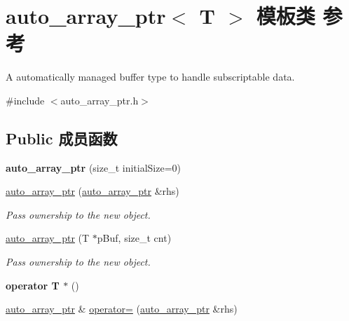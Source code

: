 \hypertarget{classauto__array__ptr}{\section{auto\+\_\+array\+\_\+ptr$<$ T $>$ 模板类 参考}
\label{classauto__array__ptr}
}


A automatically managed buffer type to handle subscriptable data.  




{\ttfamily \#include $<$auto\+\_\+array\+\_\+ptr.\+h$>$}

\subsection*{Public 成员函数}
\begin{DoxyCompactItemize}
\item 
\hypertarget{classauto__array__ptr_a7ea518e74e02d19362965a74fce2b5f2}{{\bfseries auto\+\_\+array\+\_\+ptr} (size\+\_\+t initial\+Size=0)}\label{classauto__array__ptr_a7ea518e74e02d19362965a74fce2b5f2}

\item 
\hypertarget{classauto__array__ptr_a30d6debbcb1db493ef46919e6d6b37a1}{\hyperlink{classauto__array__ptr_a30d6debbcb1db493ef46919e6d6b37a1}{auto\+\_\+array\+\_\+ptr} (\hyperlink{classauto__array__ptr}{auto\+\_\+array\+\_\+ptr} \&rhs)}\label{classauto__array__ptr_a30d6debbcb1db493ef46919e6d6b37a1}

\begin{DoxyCompactList}\small\item\em Pass ownership to the new object. \end{DoxyCompactList}\item 
\hyperlink{classauto__array__ptr_ab75a4d7273eabb7180e07316043ad836}{auto\+\_\+array\+\_\+ptr} (T $\ast$p\+Buf, size\+\_\+t cnt)
\begin{DoxyCompactList}\small\item\em Pass ownership to the new object. \end{DoxyCompactList}\item 
\hypertarget{classauto__array__ptr_a1b183d6062ad338e05ad374738e4d65c}{{\bfseries operator T $\ast$} ()}\label{classauto__array__ptr_a1b183d6062ad338e05ad374738e4d65c}

\item 
\hypertarget{classauto__array__ptr_a764352bc820c5b67b36becfb6ead7233}{\hyperlink{classauto__array__ptr}{auto\+\_\+array\+\_\+ptr} \& \hyperlink{classauto__array__ptr_a764352bc820c5b67b36becfb6ead7233}{operator=} (\hyperlink{classauto__array__ptr}{auto\+\_\+array\+\_\+ptr} \&rhs)}\label{classauto__array__ptr_a764352bc820c5b67b36becfb6ead7233}


\end{DoxyCompactItemize}
